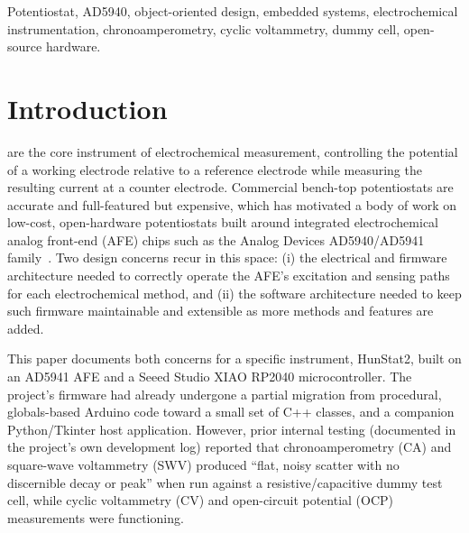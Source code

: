 \documentclass[journal]{IEEEtran}
\begin{document}
\begin{IEEEkeywords}
Potentiostat, AD5940, object-oriented design, embedded systems, electrochemical instrumentation, chronoamperometry, cyclic voltammetry, dummy cell, open-source hardware.
\end{IEEEkeywords}

\IEEEpeerreviewmaketitle

\section{Introduction}
 are the core instrument of electrochemical measurement, controlling the potential of a working electrode relative to a reference electrode while measuring the resulting current at a counter electrode. Commercial bench-top potentiostats are accurate and full-featured but expensive, which has motivated a body of work on low-cost, open-hardware potentiostats built around integrated electrochemical analog front-end (AFE) chips such as the Analog Devices AD5940/AD5941 family~\cite{ref:ad5940datasheet}. Two design concerns recur in this space: (i) the electrical and firmware architecture needed to correctly operate the AFE's excitation and sensing paths for each electrochemical method, and (ii) the software architecture needed to keep such firmware maintainable and extensible as more methods and features are added.

This paper documents both concerns for a specific instrument, HunStat2, built on an AD5941 AFE and a Seeed Studio XIAO RP2040 microcontroller. The project's firmware had already undergone a partial migration from procedural, globals-based Arduino code toward a small set of C++ classes, and a companion Python/Tkinter host application. However, prior internal testing (documented in the project's own development log) reported that chronoamperometry (CA) and square-wave voltammetry (SWV) produced ``flat, noisy scatter with no discernible decay or peak'' when run against a resistive/capacitive dummy test cell, while cyclic voltammetry (CV) and open-circuit potential (OCP) measurements were functioning.
\end{document}
